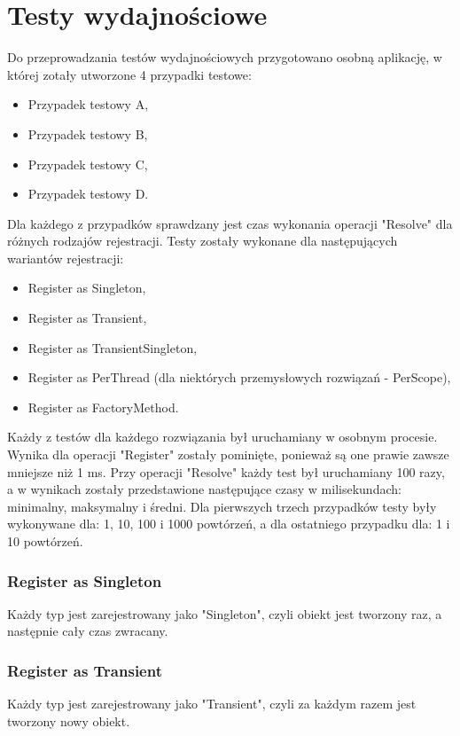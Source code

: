 \documentclass[12pt]{article}
\begin{document}
\clearpage
\section{Testy wydajnościowe}
Do przeprowadzania testów wydajnościowych przygotowano osobną aplikację, w której zotały utworzone 4 przypadki testowe:
\begin{itemize}
	\item Przypadek testowy A,
	\item Przypadek testowy B,
	\item Przypadek testowy C,
	\item Przypadek testowy D.
\end{itemize}
Dla każdego z przypadków sprawdzany jest czas wykonania operacji "Resolve" dla różnych rodzajów rejestracji. Testy zostały wykonane dla następujących wariantów rejestracji:
\begin{itemize}
	\item Register as Singleton,
	\item Register as Transient,
	\item Register as TransientSingleton,
	\item Register as PerThread (dla niektórych przemysłowych rozwiązań - PerScope),
	\item Register as FactoryMethod.
\end{itemize}
Każdy z testów dla każdego rozwiązania był uruchamiany w osobnym procesie. Wynika dla operacji "Register" zostały pominięte, ponieważ są one prawie zawsze mniejsze niż 1 ms. Przy operacji "Resolve" każdy test był uruchamiany 100 razy, a w wynikach zostały przedstawione następujące czasy w milisekundach: minimalny, maksymalny i średni. Dla pierwszych trzech przypadków testy były wykonywane dla: 1, 10, 100 i 1000 powtórzeń, a dla ostatniego przypadku dla: 1 i 10 powtórzeń.

\subsubsection{Register as Singleton}
Każdy typ jest zarejestrowany jako "Singleton", czyli obiekt jest tworzony raz, a następnie cały czas zwracany.

\subsubsection{Register as Transient}
Każdy typ jest zarejestrowany jako "Transient", czyli za każdym razem jest tworzony nowy obiekt.
\end{document}
